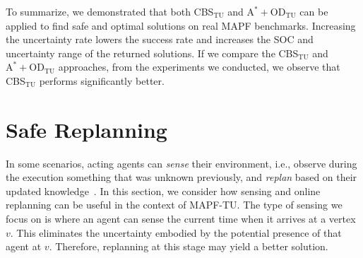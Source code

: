 \documentclass[jair,twoside,11pt,theapa]{article}
\newcommand{\odatu}{$\mathrm{A^{*}+OD_{TU}}$\xspace}
\newcommand{\cbstu}{CBS$\mathrm{_{TU}}$\xspace}
\newcommand{\mapftu}{MAPF-TU\xspace}
\begin{document}

%






To summarize, we demonstrated that both \cbstu and \odatu can be applied to find safe and optimal solutions on real MAPF benchmarks. 
Increasing the uncertainty rate lowers the success rate and increases the SOC and uncertainty range of the returned solutions.  
If we compare the \cbstu and \odatu approaches, from the experiments we conducted, we observe that \cbstu performs significantly better.



\section{Safe Replanning}
\label{sensing}

%
%


In some scenarios, acting agents can \emph{sense} their environment, i.e., observe during the execution something that was unknown previously, and \emph{replan} based on their updated knowledge~. 
In this section, we consider how sensing and online replanning can be useful in the context of \mapftu. 
The type of sensing we focus on is where an agent can sense the current time when it arrives at a vertex $v$. 
This eliminates the uncertainty embodied by the potential presence of that agent at $v$. Therefore, replanning at this stage may yield a better solution. 
\end{document}
